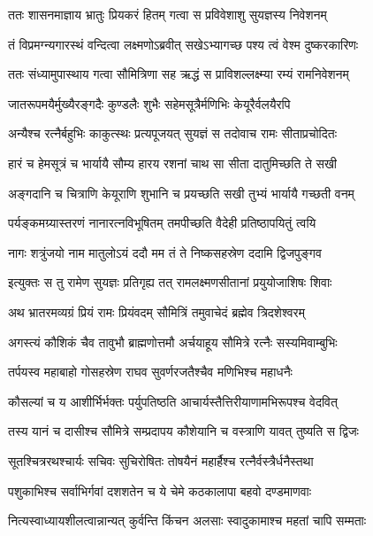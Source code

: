 
\twolineshloka
{ततः शासनमाज्ञाय भ्रातुः प्रियकरं हितम्}
{गत्वा स प्रविवेशाशु सुयज्ञस्य निवेशनम्} %

\twolineshloka
{तं विप्रमग्न्यगारस्थं वन्दित्वा लक्ष्मणोऽब्रवीत्}
{सखेऽभ्यागच्छ पश्य त्वं वेश्म दुष्करकारिणः} %

\twolineshloka
{ततः संध्यामुपास्थाय गत्वा सौमित्रिणा सह}
{ऋद्धं स प्राविशल्लक्ष्म्या रम्यं रामनिवेशनम्} %

\twolineshloka
{जातरूपमयैर्मुख्यैरङ्गदैः कुण्डलैः शुभैः}
{सहेमसूत्रैर्मणिभिः केयूरैर्वलयैरपि} %

\twolineshloka
{अन्यैश्च रत्नैर्बहुभिः काकुत्स्थः प्रत्यपूजयत्}
{सुयज्ञं स तदोवाच रामः सीताप्रचोदितः} %

\twolineshloka
{हारं च हेमसूत्रं च भार्यायै सौम्य हारय}
{रशनां चाथ सा सीता दातुमिच्छति ते सखी} %

\twolineshloka
{अङ्गदानि च चित्राणि केयूराणि शुभानि च}
{प्रयच्छति सखी तुभ्यं भार्यायै गच्छती वनम्} %

\twolineshloka
{पर्यङ्कमग्र्यास्तरणं नानारत्नविभूषितम्}
{तमपीच्छति वैदेही प्रतिष्ठापयितुं त्वयि} %

\twolineshloka
{नागः शत्रुंजयो नाम मातुलोऽयं ददौ मम}
{तं ते निष्कसहस्रेण ददामि द्विजपुङ्गव} %

\twolineshloka
{इत्युक्तः स तु रामेण सुयज्ञः प्रतिगृह्य तत्}
{रामलक्ष्मणसीतानां प्रयुयोजाशिषः शिवाः} %

\twolineshloka
{अथ भ्रातरमव्यग्रं प्रियं रामः प्रियंवदम्}
{सौमित्रिं तमुवाचेदं ब्रह्मेव त्रिदशेश्वरम्} %

\twolineshloka
{अगस्त्यं कौशिकं चैव तावुभौ ब्राह्मणोत्तमौ}
{अर्चयाहूय सौमित्रे रत्नैः सस्यमिवाम्बुभिः} %

\twolineshloka
{तर्पयस्व महाबाहो गोसहस्रेण राघव}
{सुवर्णरजतैश्चैव मणिभिश्च महाधनैः} %

\twolineshloka
{कौसल्यां च य आशीर्भिर्भक्तः पर्युपतिष्ठति}
{आचार्यस्तैत्तिरीयाणामभिरूपश्च वेदवित्} %

\twolineshloka
{तस्य यानं च दासीश्च सौमित्रे सम्प्रदापय}
{कौशेयानि च वस्त्राणि यावत् तुष्यति स द्विजः} %

\twolineshloka
{सूतश्चित्ररथश्चार्यः सचिवः सुचिरोषितः}
{तोषयैनं महार्हैश्च रत्नैर्वस्त्रैर्धनैस्तथा} %

\twolineshloka
{पशुकाभिश्च सर्वाभिर्गवां दशशतेन च}
{ये चेमे कठकालापा बहवो दण्डमाणवाः} %

\twolineshloka
{नित्यस्वाध्यायशीलत्वान्नान्यत् कुर्वन्ति किंचन}
{अलसाः स्वादुकामाश्च महतां चापि सम्मताः} %

